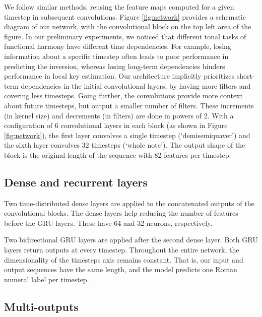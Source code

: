 We follow similar methods, reusing the feature maps computed for a given timestep in subsequent convolutions. 
Figure \ref{fig:network} provides a schematic diagram of our network, with the convolutional block on the top left area of the figure. 
In our preliminary experiments, we noticed that different tonal tasks of functional harmony have different time dependencies. 
For example, losing information about a specific timestep often leads to poor performance in predicting the inversion, whereas losing long-term dependencies hinders performance in local key estimation. 
Our architecture implicitly prioritizes short-term dependencies in the initial convolutional layers, by having more filters and covering less timesteps. Going further, the convolutions provide more context about future timesteps, but output a smaller number of filters. These increments (in kernel size) and decrements (in filters) are done in powers of 2. With a configuration of 6 convolutional layers in each block (as shown in Figure \ref{fig:network}), the first layer convolves a single timestep (`demisemiquaver') and the sixth layer convolves 32 timesteps (`whole note'). The output shape of the block is the original length of the sequence with 82 features per timestep.

\subsection{Dense and recurrent layers}

Two time-distributed dense layers are applied to the concatenated outputs of the convolutional blocks. The dense layers help reducing the number of features before the GRU layers. These have 64 and 32 neurons, respectively. 

Two bidirectional GRU \cite{cho_learning_2014} layers are applied after the second dense layer. 
Both GRU layers return outputs at every timestep. 
Throughout the entire network, the dimensionality of the timesteps axis remains constant. That is, our input and output sequences have the same length, and the model predicts one Roman numeral label per timestep. 

\subsection{Multi-outputs}

